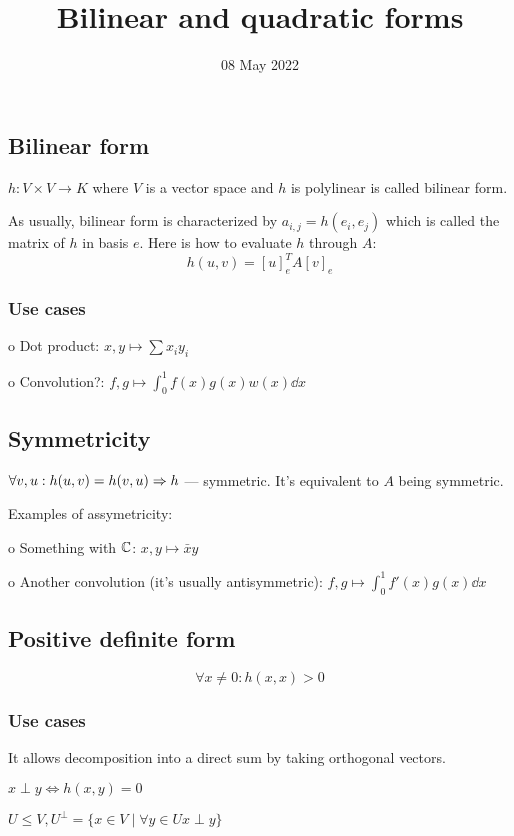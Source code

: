 
\title{Bilinear and quadratic forms}
\author{}
\date{08 May 2022}

\maketitle

\subsection*{Bilinear form}
$h: V \times V \to K$ where $V$ is a vector space and $h$ is polylinear
is called bilinear form.

As usually, bilinear form is characterized by $a_{i,j} = h(e_i, e_j)$ which
is called the matrix of $h$ in basis $e$.
Here is how to evaluate $h$ through $A$:
\[ h(u, v) = [u]_e^T A [v]_e \] 

\subsubsection*{Use cases}

o Dot product: $x, y \mapsto \sum x_i y_i $

o Convolution?: $f, g \mapsto \int_0^1 f(x)g(x)w(x) \dd{x}$

\subsection*{Symmetricity}
$\forall v, u: h(u, v) = h(v, u) \Rightarrow h$ --- symmetric.
It's equivalent to $A$ being symmetric.


Examples of assymetricity:

o Something with $\mathbb C$: $x, y \mapsto \bar x y$

o Another convolution (it's usually antisymmetric):
$ f, g \mapsto \int_0^1 f'(x)g(x) \dd{x}$

\subsection*{Positive definite form}
\[ \forall x \ne 0: h(x, x) > 0 \]  

\subsubsection*{Use cases}

It allows decomposition into a direct sum by taking orthogonal vectors.

\begin{df} $x \perp y \iff h(x, y) = 0$ \end{df}
\begin{df} $U \le V, U^\perp = \{ x \in V \mid \forall y \in U x \perp y \} $
\end{df}

